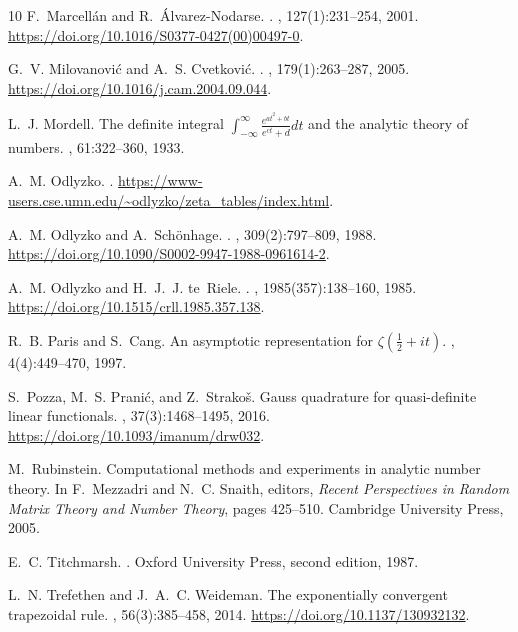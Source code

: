 \documentclass[12pt]{article}
\theoremstyle{definition}
\begin{document}
\begin{thebibliography}{10}
F.~Marcell\'an and R.~\'Alvarez-Nodarse.
.
,
  127(1):231--254, 2001.
\newblock \url{https://doi.org/10.1016/S0377-0427(00)00497-0}.

G.~V. Milovanovi\'c and A.~S. Cvetkovi\'c.
.
,
  179(1):263--287, 2005.
\newblock \url{https://doi.org/10.1016/j.cam.2004.09.044}.

L.~J. Mordell.
\newblock The definite integral $\int_{-\infty}^{\infty}
  \frac{e^{at^2+bt}}{e^{ct}+d}dt$ and the analytic theory of numbers.
, 61:322--360, 1933.

A.~M. Odlyzko.
.
\newblock \url{https://www-users.cse.umn.edu/~odlyzko/zeta_tables/index.html}.

A.~M. Odlyzko and A.~Sch\"onhage.
.
, 309(2):797--809, 1988.
\newblock \url{https://doi.org/10.1090/S0002-9947-1988-0961614-2}.

A.~M. Odlyzko and H.~J.~J. te~Riele.
.
,
  1985(357):138--160, 1985.
\newblock \url{https://doi.org/10.1515/crll.1985.357.138}.

R.~B. Paris and S.~Cang.
\newblock An asymptotic representation for $\zeta(\frac{1}{2}+i t)$.
, 4(4):449--470, 1997.

S.~Pozza, M.~S. Prani{\'c}, and Z.~Strako{\v s}.
\newblock Gauss quadrature for quasi-definite linear functionals.
, 37(3):1468--1495, 2016.
\newblock \url{https://doi.org/10.1093/imanum/drw032}.

M.~Rubinstein.
\newblock Computational methods and experiments in analytic number theory.
\newblock In F.~Mezzadri and N.~C. Snaith, editors, {\em Recent Perspectives in
  Random Matrix Theory and Number Theory}, pages 425--510. Cambridge University
  Press, 2005.

E.~C. Titchmarsh.
.
\newblock Oxford University Press, second edition, 1987.

L.~N. Trefethen and J.~A.~C. Weideman.
\newblock The exponentially convergent trapezoidal rule.
, 56(3):385--458, 2014.
\newblock \url{https://doi.org/10.1137/130932132}.

\end{thebibliography}
\end{document}
